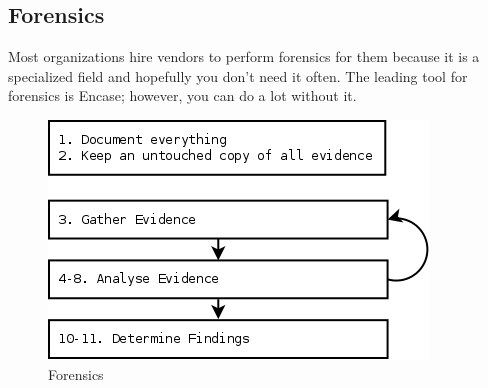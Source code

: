\subsection{Forensics}
Most organizations hire vendors to perform forensics for them because it is a specialized field and hopefully you don't need it often. The leading tool for forensics is Encase; however, you can do a lot without it.
\begin{figure}[h]
\centering\includegraphics[scale=.75]{./img/Forensics}
\caption{Forensics}
\end{figure}

